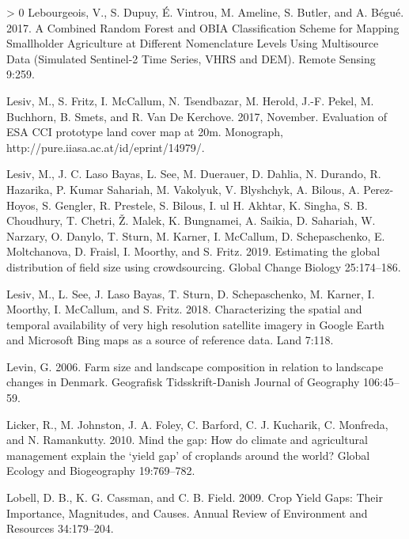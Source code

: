 \documentclass[11pt,a4paper]{article}
\newlength{\cslhangindent}
\newenvironment{CSLReferences}[3] %
 {%
  \setlength{\parindent}{0pt}
  \ifodd #1 \everypar{\setlength{\hangindent}{\cslhangindent}}\ignorespaces\fi
  \ifnum #2 > 0
  \setlength{\parskip}{#2\baselineskip}
  \fi
 }%
 {}
\begin{document}
\begin{CSLReferences}{1}{0}
\leavevmode\hypertarget{ref-lebourgeoisCombinedRandomForest2017}{}%
Lebourgeois, V., S. Dupuy, É. Vintrou, M. Ameline, S. Butler, and A.
Bégué. 2017. A {Combined Random Forest} and {OBIA Classification Scheme}
for {Mapping Smallholder Agriculture} at {Different Nomenclature Levels
Using Multisource Data} ({Simulated Sentinel}-2 {Time Series}, {VHRS}
and {DEM}). Remote Sensing 9:259.

\leavevmode\hypertarget{ref-LesivEvaluationESACCI2017}{}%
Lesiv, M., S. Fritz, I. McCallum, N. Tsendbazar, M. Herold, J.-F. Pekel,
M. Buchhorn, B. Smets, and R. Van De Kerchove. 2017, November.
Evaluation of {ESA CCI} prototype land cover map at 20m. Monograph,
http://pure.iiasa.ac.at/id/eprint/14979/.

\leavevmode\hypertarget{ref-lesivEstimatingGlobalDistribution2019}{}%
Lesiv, M., J. C. Laso Bayas, L. See, M. Duerauer, D. Dahlia, N. Durando,
R. Hazarika, P. Kumar Sahariah, M. Vakolyuk, V. Blyshchyk, A. Bilous, A.
Perez-Hoyos, S. Gengler, R. Prestele, S. Bilous, I. ul H. Akhtar, K.
Singha, S. B. Choudhury, T. Chetri, Ž. Malek, K. Bungnamei, A. Saikia,
D. Sahariah, W. Narzary, O. Danylo, T. Sturn, M. Karner, I. McCallum, D.
Schepaschenko, E. Moltchanova, D. Fraisl, I. Moorthy, and S. Fritz.
2019. Estimating the global distribution of field size using
crowdsourcing. Global Change Biology 25:174--186.

\leavevmode\hypertarget{ref-LesivCharacterizingspatialtemporal2018}{}%
Lesiv, M., L. See, J. Laso Bayas, T. Sturn, D. Schepaschenko, M. Karner,
I. Moorthy, I. McCallum, and S. Fritz. 2018. Characterizing the spatial
and temporal availability of very high resolution satellite imagery in
{Google Earth} and {Microsoft Bing} maps as a source of reference data.
Land 7:118.

\leavevmode\hypertarget{ref-levinFarmSizeLandscape2006}{}%
Levin, G. 2006. Farm size and landscape composition in relation to
landscape changes in {Denmark}. Geografisk Tidsskrift-Danish Journal of
Geography 106:45--59.

\leavevmode\hypertarget{ref-LickerMindgaphow2010}{}%
Licker, R., M. Johnston, J. A. Foley, C. Barford, C. J. Kucharik, C.
Monfreda, and N. Ramankutty. 2010. Mind the gap: How do climate and
agricultural management explain the {`yield gap'} of croplands around
the world? Global Ecology and Biogeography 19:769--782.

\leavevmode\hypertarget{ref-lobellCropYieldGaps2009}{}%
Lobell, D. B., K. G. Cassman, and C. B. Field. 2009. Crop {Yield Gaps}:
Their {Importance}, {Magnitudes}, and {Causes}. Annual Review of
Environment and Resources 34:179--204.


\end{CSLReferences}
\end{document}
